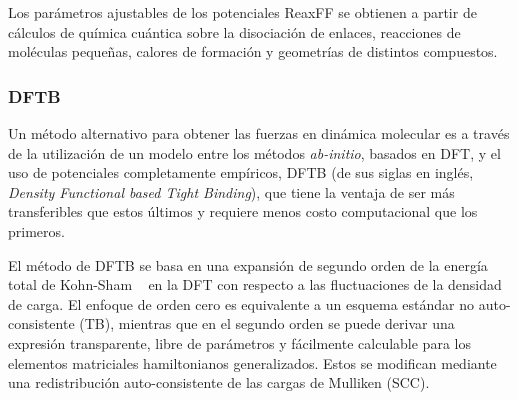 Los parámetros ajustables de los potenciales ReaxFF se obtienen a partir de 
cálculos de química cuántica sobre la disociación de enlaces, reacciones de 
moléculas pequeñas, calores de formación y geometrías de distintos compuestos.

\subsubsection{DFTB}

Un método alternativo para obtener las fuerzas en dinámica molecular es a través
de la utilización de un modelo  entre los métodos \textit{ab-initio},
basados en DFT, y el uso de potenciales completamente empíricos, DFTB (de sus 
siglas en inglés, \textit{Density Functional based Tight Binding}), que tiene
la ventaja de ser más transferibles que estos últimos y requiere menos costo
computacional que los primeros.

El método de DFTB se basa en una expansión de segundo orden de la energía total 
de Kohn-Sham ~\cite{dft1, dft2} en la DFT con respecto a las fluctuaciones de la 
densidad de carga. El enfoque de orden cero es equivalente a un esquema estándar 
no auto-consistente (TB), mientras que en el segundo orden se puede derivar una 
expresión transparente, libre de parámetros y fácilmente calculable para los 
elementos matriciales hamiltonianos generalizados. Estos se modifican mediante 
una redistribución auto-consistente de las cargas de Mulliken (SCC).

